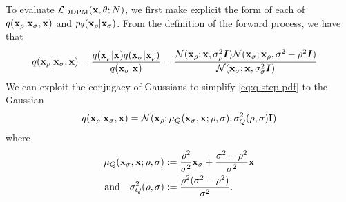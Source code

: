To evaluate $\mathcal{L}_\text{DDPM}({\mathbf{x}}, \theta; N)$, we first make explicit the form of each of $q({\mathbf{x}}_{\rho} | {\mathbf{x}}_{\sigma}, {\mathbf{x}})$ and $p_\theta({\mathbf{x}}_{\rho} | {\mathbf{x}}_{\sigma})$. From the definition of the forward process, we have that
\begin{align} \label{eq:q-step-pdf}
    q({\mathbf{x}}_{\rho} | {\mathbf{x}}_{\sigma}, {\mathbf{x}}) &= \frac{q({\mathbf{x}}_{\rho} | {\mathbf{x}}) q({\mathbf{x}}_{\sigma} | {\mathbf{x}}_{\rho})}{q({\mathbf{x}}_{\sigma}|{\mathbf{x}})} = \frac{{\mathcal{N}}({\mathbf{x}}_{\rho}; {\mathbf{x}}, \sigma_{\rho}^2 {\bm{I}}) {\mathcal{N}}({\mathbf{x}}_{\sigma}; {\mathbf{x}}_{\rho}, \sigma^2-\rho^2 {\bm{I}}) }{{\mathcal{N}}({\mathbf{x}}_{\sigma}; {\mathbf{x}}, \sigma_{\sigma}^2 {\bm{I}})}
\end{align}
We can exploit the conjugacy of Gaussians to simplify \cref{eq:q-step-pdf} to the Gaussian
\begin{align}
    q({\mathbf{x}}_\rho|{\mathbf{x}}_\sigma,{\mathbf{x}}) = {\mathcal{N}}( {\mathbf{x}}_\rho; \mathbf{\mu}_Q({\mathbf{x}}_\sigma, {\mathbf{x}}; \rho, \sigma), \sigma_Q^2(\rho, \sigma) \mathbf{I})
\end{align}
where
\begin{align} \label{eq:mu-q}
    \mathbf{\mu}_Q({\mathbf{x}}_\sigma, {\mathbf{x}}; \rho, \sigma) &:= \frac{\rho^2}{\sigma^2} {\mathbf{x}}_\sigma + \frac{\sigma^2-\rho^2}{\sigma^2} {\mathbf{x}} \\
    \label{eq:sigma-q}
    \text{and}\quad 
    \sigma_Q^2(\rho, \sigma) &:= \frac{\rho^2 (\sigma^2-\rho^2)}{\sigma^2}.
\end{align}

